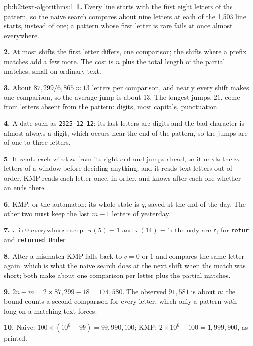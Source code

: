 \begin{solution}{pb:b2:text-algorithms:1}
\textbf{1.} Every line starts with the first eight letters of the pattern, so the naive search compares about nine
letters at each of the 1,503 line starts, instead of one; a pattern whose first letter is rare fails at once almost
everywhere.

\textbf{2.} At most shifts the first letter differs, one comparison; the shifts where a prefix matches add a few more.
The cost is $n$ plus the total length of the partial matches, small on ordinary text.

\textbf{3.} About $87{,}299 / 6{,}865 \approx 13$ letters per comparison, and nearly every shift makes one comparison,
so the average jump is about 13. The longest jumps, $21$, come from letters absent from the pattern: digits, most
capitals, punctuation.

\textbf{4.} A date such as \texttt{2025-12-12}: its last letters are digits and the bad character is almost always a
digit, which occurs near the end of the pattern, so the jumps are of one to three letters.

\textbf{5.} It reads each window from its right end and jumps ahead, so it needs the $m$ letters of a window before
deciding anything, and it reads text letters out of order. KMP reads each letter once, in order, and knows after each
one whether an  ends there.

\textbf{6.} KMP, or the automaton: its whole state is $q$, saved at the end of the day. The other two must keep the last
$m - 1$ letters of yesterday.

\textbf{7.} $\pi$ is $0$ everywhere except $\pi(5) = 1$ and $\pi(14) = 1$: the only  are \texttt{r}, for
\texttt{retur} and \texttt{returned Under}.

\textbf{8.} After a mismatch KMP falls back to $q = 0$ or $1$ and compares the same letter again, which is what the naive
search does at the next shift when the match was short; both make about one comparison per letter plus the partial
matches.

\textbf{9.} $2n - m = 2 \times 87{,}299 - 18 = 174{,}580$. The observed $91{,}581$ is about $n$: the bound counts a
second comparison for every letter, which only a pattern with long  on a matching text forces.

\textbf{10.} Naive: $100 \times (10^6 - 99) = 99{,}990{,}100$; KMP: $2 \times 10^6 - 100 = 1{,}999{,}900$, as printed.


\end{solution}

